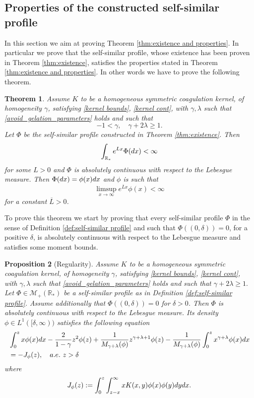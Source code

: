 \documentclass[11pt]{article}
\numberwithin{equation}{section}
\theoremstyle{plain}
\newtheorem{theorem}{Theorem}[section]
\newtheorem{proposition}[theorem]{Proposition}
\newcommand{\der}{\textup{d}}
\begin{document}
\subsection{Properties of the constructed self-similar profile}
In this section we aim at proving Theorem \ref{thm:existence and properties}. In particular we prove that the self-similar profile, whose existence has been proven in Theorem \ref{thm:existence}, satisfies the properties stated in Theorem \ref{thm:existence and properties}. 
In other words we have to prove the following theorem. 
\begin{theorem}\label{thm:properties of the constructed s.p.}
Assume $K$ to be a homogeneous symmetric coagulation kernel, of homogeneity $\gamma$, satisfying
\eqref{kernel bounds},  \eqref{kernel cont},  with $\gamma , \lambda $ such that  \eqref{avoid_gelation_parameters} holds and such that
\[
-1 < \gamma, \quad \gamma+2\lambda \geq  1.
\] 
Let $\Phi$ be the self-similar profile constructed in Theorem \ref{thm:existence}. 
Then 
\[
\int_{\mathbb R_*} e^{Lx } \Phi(\der x) < \infty 
\] 
for some $L>0$ and $\Phi$ is absolutely continuous with respect to the Lebesgue measure. 
Then $\Phi(\der x )=\phi(x) \der x  $ and $\phi$ is such that 
\[
\limsup_{x  \rightarrow \infty} e^{ \overline{L} x} \phi(x) < \infty
\]
for a constant $\overline{L}>0$. 
\end{theorem}
To prove this theorem we start by proving that every self-similar profile $\Phi$ in the sense of Definition \ref{def:self-similar profile} and such that $\Phi((0, \delta))=0$, for a positive $\delta$,
is absolutely continuous with respect to the Lebesgue measure and satisfies some moment bounds. 
\begin{proposition}[Regularity] \label{prop:regularity}
Assume $K$ to be a homogeneous symmetric coagulation kernel, of homogeneity $\gamma$, satisfying
\eqref{kernel bounds},  \eqref{kernel cont},  with $\gamma , \lambda $ such that  \eqref{avoid_gelation_parameters} holds and such that $ \gamma+2\lambda \geq  1.$
	Let $\Phi \in \mathcal M_+(\mathbb R_*)$ be a self-similar profile as in Definition \ref{def:self-similar profile}.
	Assume additionally that $\Phi((0, \delta ))=0$ for $\delta >0$. 
	Then $\Phi$ is absolutely continuous with respect to the Lebesgue measure. 
	Its density $\phi \in L^1([\delta, \infty ))$ satisfies the following equation 
	\begin{align} \label{flux form} 
&\int_0^z x \phi(x) dx - \frac{2}{1-\gamma} z^2 \phi(z) + \frac{1}{M_{\gamma+\lambda}(\phi)} z^{\gamma +\lambda +1 } \phi(z) - \frac{1}{M_{\gamma+\lambda}(\phi) } \int_0^z x^{\gamma +\lambda }\phi(x) \der x \\
	& = - J_\phi(z), \quad a.e.\  z > \delta \nonumber
	\end{align} 
	where 
	\begin{equation}\label{flux def}
	J_\phi(z):= \int_0^z \int_{z-x}^\infty x K(x,y) \phi(x) \phi(y) \der y \der x.
	\end{equation}
\end{proposition}
\end{document}
